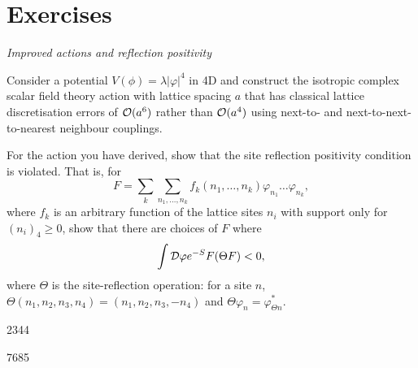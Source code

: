 \section*{Exercises}
\problem
    {{\it Improved actions and reflection positivity}
    
    Consider a potential $V(\phi)=\lambda |\varphi|^4$ in 4D and construct the isotropic complex scalar field theory action with lattice spacing $a$ that has classical lattice discretisation errors of ${\cal O}(a^6)$ rather than ${\cal O}(a^4)$ using next-to- and next-to-next-to-nearest neighbour couplings. 
    
    For the action you have derived, show that the site reflection positivity condition is violated. That is, for
    $$F=\sum_k \sum_{n_1, \ldots, n_k} f_k\left(n_1, \ldots, n_k\right) \varphi_{n_1} \ldots \varphi_{n_k},$$
    where $f_k$ is an arbitrary function of the lattice sites $n_i$ with support only for $(n_{i})_{4}\ge 0$, show that there are choices of $F$ where $$\int {\cal D}{\varphi} e^{-S} F(\Theta F)< 0,$$ where $\Theta$ is the site-reflection operation: for a site $n$, $\Theta (n_1, n_2, n_3, n_4)= (n_1, n_2, n_3, -n_4)$ and $\Theta \varphi_n=\varphi^*_{\Theta n}$.
    }
    {2344}
    
    
    {7685}



    





